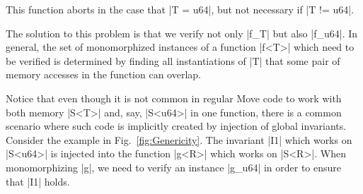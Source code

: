 \noindent This function aborts in the case that |T = u64|, but not necessary if |T != u64|.

The solution to this problem is that we verify not only |f_T| but also
|f_u64|. In general, the set of monomorphized instances of a function |f<T>|
which need to be verified is determined by finding all instantiations of |T|
that some pair of memory accesses in the function can overlap.


Notice that even though it is not common in regular Move code to work with both
memory |S<T>| and, say, |S<u64>| in one function, there is a common scenario
where such code is implicitly created by injection of global
invariants. Consider the example in Fig.~\ref{fig:Genericity}. The invariant
|I1| which works on |S<u64>| is injected into the function |g<R>| which works on
|S<R>|. When monomorphizing |g|, we need to verify an instance |g_u64| in order
to ensure that |I1| holds.



